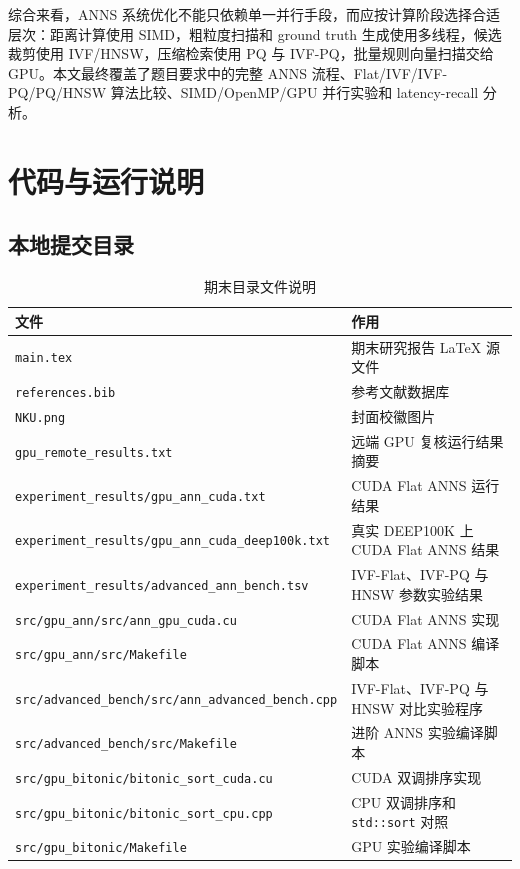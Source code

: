 \documentclass[UTF8,a4paper,10pt]{ctexart}
\begin{document}
综合来看，ANNS 系统优化不能只依赖单一并行手段，而应按计算阶段选择合适层次：距离计算使用 SIMD，粗粒度扫描和 ground truth 生成使用多线程，候选裁剪使用 IVF/HNSW，压缩检索使用 PQ 与 IVF-PQ，批量规则向量扫描交给 GPU。本文最终覆盖了题目要求中的完整 ANNS 流程、Flat/IVF/IVF-PQ/PQ/HNSW 算法比较、SIMD/OpenMP/GPU 并行实验和 latency-recall 分析。

\newpage



\newpage
\appendix
\section{代码与运行说明}

\subsection{本地提交目录}

\begin{table}[H]
\centering
\caption{期末目录文件说明}
\label{tab:files}
\begin{tabular}{ll}
\toprule
文件 & 作用 \\
\midrule
\texttt{main.tex} & 期末研究报告 LaTeX 源文件 \\
\texttt{references.bib} & 参考文献数据库 \\
\texttt{NKU.png} & 封面校徽图片 \\
\texttt{gpu\_remote\_results.txt} & 远端 GPU 复核运行结果摘要 \\
\texttt{experiment\_results/gpu\_ann\_cuda.txt} & CUDA Flat ANNS 运行结果 \\
\texttt{experiment\_results/gpu\_ann\_cuda\_deep100k.txt} & 真实 DEEP100K 上 CUDA Flat ANNS 结果 \\
\texttt{experiment\_results/advanced\_ann\_bench.tsv} & IVF-Flat、IVF-PQ 与 HNSW 参数实验结果 \\
\texttt{src/gpu\_ann/src/ann\_gpu\_cuda.cu} & CUDA Flat ANNS 实现 \\
\texttt{src/gpu\_ann/src/Makefile} & CUDA Flat ANNS 编译脚本 \\
\texttt{src/advanced\_bench/src/ann\_advanced\_bench.cpp} & IVF-Flat、IVF-PQ 与 HNSW 对比实验程序 \\
\texttt{src/advanced\_bench/src/Makefile} & 进阶 ANNS 实验编译脚本 \\
\texttt{src/gpu\_bitonic/bitonic\_sort\_cuda.cu} & CUDA 双调排序实现 \\
\texttt{src/gpu\_bitonic/bitonic\_sort\_cpu.cpp} & CPU 双调排序和 \texttt{std::sort} 对照 \\
\texttt{src/gpu\_bitonic/Makefile} & GPU 实验编译脚本 \\
\bottomrule
\end{tabular}
\end{table}
\end{document}
